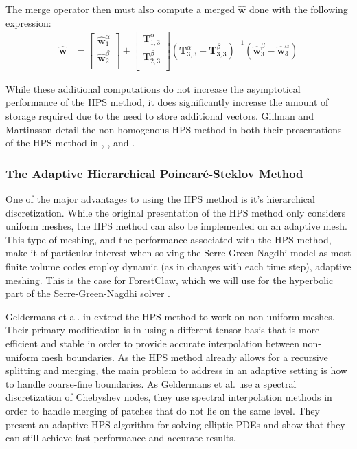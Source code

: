 The merge operator then must also compute a merged $\hat{\textbf{w}}$ done with the following expression:
\begin{align}
    \hat{\textbf{w}} &=
    \begin{bmatrix}
        \hat{\textbf{w}}_1^{\alpha} \\
        \hat{\textbf{w}}_2^{\beta} \\
    \end{bmatrix} +
    \begin{bmatrix}
        \textbf{T}_{1,3}^{\alpha} \\
        \textbf{T}_{2,3}^{\beta} \\
    \end{bmatrix}
    (\textbf{T}_{3,3}^{\alpha} - \textbf{T}_{3,3}^{\beta})^{-1} (\hat{\textbf{w}}_3^{\beta} - \hat{\textbf{w}}_3^{\alpha})
\end{align}

While these additional computations do not increase the asymptotical performance of the HPS method, it does significantly increase the amount of storage required due to the need to store additional vectors. Gillman and Martinsson detail the non-homogenous HPS method in both their presentations of the HPS method in \cite{gillman2014direct}, \cite{martinsson2015hierarchical}, and \cite{martinsson2019fast}.

\subsubsection{The Adaptive Hierarchical Poincaré-Steklov Method}

One of the major advantages to using the HPS method is it's hierarchical discretization. While the original presentation of the HPS method only considers uniform meshes, the HPS method can also be implemented on an adaptive mesh. This type of meshing, and the performance associated with the HPS method, make it of particular interest when solving the Serre-Green-Nagdhi model as most finite volume codes employ dynamic (as in changes with each time step), adaptive meshing. This is the case for ForestClaw, which we will use for the hyperbolic part of the Serre-Green-Nagdhi solver \cite{calhoun2017forestclaw}.

Geldermans et al. in \cite{geldermans2019adaptive} extend the HPS method to work on non-uniform meshes. Their primary modification is in using a different tensor basis that is more efficient and stable in order to provide accurate interpolation between non-uniform mesh boundaries. As the HPS method already allows for a recursive splitting and merging, the main problem to address in an adaptive setting is how to handle coarse-fine boundaries. As Geldermans et al. use a spectral discretization of Chebyshev nodes, they use spectral interpolation methods in order to handle merging of patches that do not lie on the same level. They present an adaptive HPS algorithm for solving elliptic PDEs and show that they can still achieve fast performance and accurate results.

